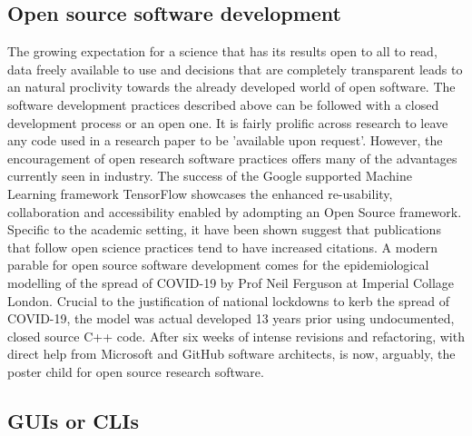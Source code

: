 \documentclass[../main.tex]{subfiles}
\begin{document}

\subsection{Open source software development}

The growing expectation for a science that has its results open to all to read, data freely available to use and decisions that are completely transparent leads to an natural proclivity towards the already developed world of open software. The software development practices described above can be followed with a closed development process or an open one. It is fairly prolific across research to leave any code used in a research paper to be 'available upon request'. However, the encouragement of open research software practices offers many of the advantages currently seen in industry. The success of the Google supported Machine Learning framework TensorFlow showcases the enhanced re-usability, collaboration and accessibility enabled by adompting an Open Source framework. Specific to the academic setting,  it have been shown suggest that publications that follow open science practices tend to have increased citations. A modern parable for open source software development comes for the epidemiological modelling of the spread of COVID-19 by Prof Neil Ferguson at Imperial Collage London. Crucial to the justification of national lockdowns to kerb the spread of COVID-19, the model was actual developed 13 years prior using undocumented, closed source C++ code. After six weeks of intense revisions and refactoring, with direct help from Microsoft and GitHub software architects,  is now, arguably, the poster child for open source research software.




\subsection{GUIs or CLIs}
\end{document}
